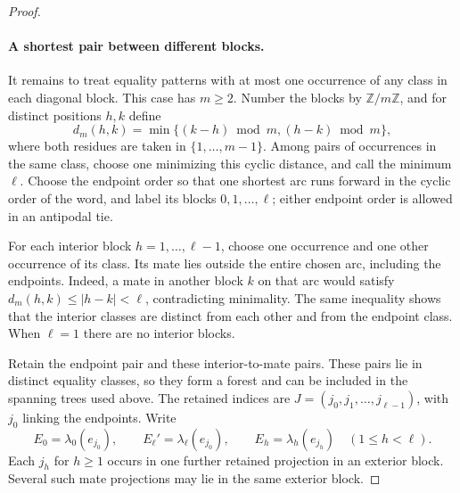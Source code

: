 \begin{proof}
\paragraph{A shortest pair between different blocks.}
It remains to treat equality patterns with at most one occurrence of
any class in each diagonal block. This case has $m\geq2$. Number the
blocks by $\mathbb Z/m\mathbb Z$, and for distinct positions $h,k$ define
\[
 d_m(h,k)=\min\{(k-h)\bmod m,(h-k)\bmod m\},
\]
where both residues are taken in $\{1,\ldots,m-1\}$. Among pairs of
occurrences in the same class, choose one minimizing this cyclic distance,
and call the minimum $\ell$. Choose the endpoint order so that one shortest
arc runs forward in the cyclic order of the word, and label its blocks
$0,1,\ldots,\ell$; either endpoint order is allowed in an antipodal tie.

For each interior block $h=1,\ldots,\ell-1$, choose one occurrence and
one other occurrence of its class. Its mate lies outside the entire chosen
arc, including the endpoints. Indeed, a mate in another block $k$ on that
arc would satisfy $d_m(h,k)\leq|h-k|<\ell$, contradicting minimality.
The same inequality shows that the interior classes are distinct from each
other and from the endpoint class. When $\ell=1$ there are no interior
blocks.

Retain the endpoint pair and these interior-to-mate pairs. These pairs
lie in distinct equality classes, so they form a forest and can be
included in the spanning trees used above. The retained indices are
$J=(j_0,j_1,\ldots,j_{\ell-1})$, with $j_0$ linking the endpoints.
Write
\[
 E_0=\lambda_0(e_{j_0}),\qquad
 E_\ell'=\lambda_\ell(e_{j_0}),\qquad
 E_h=\lambda_h(e_{j_h})\quad(1\le h<\ell).
\]
Each $j_h$ for $h\ge1$ occurs in one further retained projection in an
exterior block. Several such mate projections may lie in the same
exterior block.


\end{proof}
